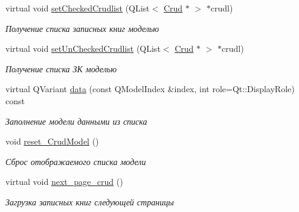\begin{DoxyCompactItemize}
\mbox{\label{class_m_t_m___crud_a90a6d07b98bc95eff4feecd56edec402}} 
virtual void \mbox{\hyperlink{class_m_t_m___crud_a90a6d07b98bc95eff4feecd56edec402}{set\+Checked\+Crudlist}} (Q\+List$<$ \mbox{\hyperlink{class_crud}{Crud}} $\ast$ $>$ $\ast$crudl)
\begin{DoxyCompactList}\small\item\em Получение списка записных книг моделью \end{DoxyCompactList}\item 
\mbox{\label{class_m_t_m___crud_a7395f071ecb05fade0cb761a1875a86b}} 
virtual void \mbox{\hyperlink{class_m_t_m___crud_a7395f071ecb05fade0cb761a1875a86b}{set\+Un\+Checked\+Crudlist}} (Q\+List$<$ \mbox{\hyperlink{class_crud}{Crud}} $\ast$ $>$ $\ast$crudl)
\begin{DoxyCompactList}\small\item\em Получение списка ЗК моделью \end{DoxyCompactList}\item 
\mbox{\label{class_m_t_m___crud_a11ecbe5dc28b42598986e67d4889e444}} 
virtual Q\+Variant \mbox{\hyperlink{class_m_t_m___crud_a11ecbe5dc28b42598986e67d4889e444}{data}} (const Q\+Model\+Index \&index, int role=Qt\+::\+Display\+Role) const
\begin{DoxyCompactList}\small\item\em Заполнение модели данными из списка \end{DoxyCompactList}\item 
\mbox{\label{class_m_t_m___crud_a95a1839d821500f06ebd96198159a164}} 
void \mbox{\hyperlink{class_m_t_m___crud_a95a1839d821500f06ebd96198159a164}{reset\+\_\+\+Crud\+Model}} ()
\begin{DoxyCompactList}\small\item\em Сброс отображаемого списка модели \end{DoxyCompactList}\item 
\mbox{\label{class_m_t_m___crud_a8187725fec1ce52361b4b7bc69d689c8}} 
virtual void \mbox{\hyperlink{class_m_t_m___crud_a8187725fec1ce52361b4b7bc69d689c8}{next\+\_\+page\+\_\+crud}} ()
\begin{DoxyCompactList}\small\item\em Загрузка записных книг следующей страницы \end{DoxyCompactList}\item 

\end{DoxyCompactItemize}
